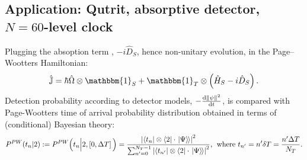 \documentclass[a0,portrait]{a0poster}
\newcommand{\idop}{\mathbbm{1}}           %
\newcommand{\ox}{\otimes}
\renewcommand{\op}{\hat}                  %
\newcommand{\smallback}{\hspace{-0.115em}}
\newcommand{\dket}[1]{\left.\left| #1 \right\rangle\smallback\right\rangle}
\begin{document}
\begin{multicols}{2}

\section*{Application: Qutrit, absorptive detector, $N=60$-level clock}

Plugging the absoption term \cite{RuschhauptAbsorption}, $-i \op{D}_S$, hence non-unitary evolution, in the Page--Wootters Hamiltonian:
\begin{equation*}\label{eq:pwHamiltonian:nonUnitary}
  \op{\mathbb{J}} = \hbar\op{\Omega}\ox\idop_S + \idop_T\ox\qty(\op{H}_S -i \op{D}_S) \,\text{.}
\end{equation*}
Detection probability according to detector models, $-\dv{\norm{\psi}^2}{t}$, is compared with Page-Wootters
time of arrival probability distribution obtained in terms of (conditional) Bayesian theory:
\begin{multline*}\label{eq:3lev:bayesPW}
  P^{PW}(t_n|2) := P^{PW}\Big( t_n \Big| 2, \left[0,\Delta{T}\right]\Big) = \frac{
    \abs{\bra{t_n} \ox \bra{2} \cdot \dket{\Psi}}^2
  }{
    \sum_{n'=0}^{N_{T} - 1} \abs{\bra{t_{n'}} \ox \bra{2} \cdot \dket{\Psi}}^2
  }
  \text{,}\;
  \text{ where } t_{n'} = n'\delta{T} = \frac{n'\Delta{T}}{N_{T}}
  \text{.}
\end{multline*}


\end{multicols}
\end{document}
